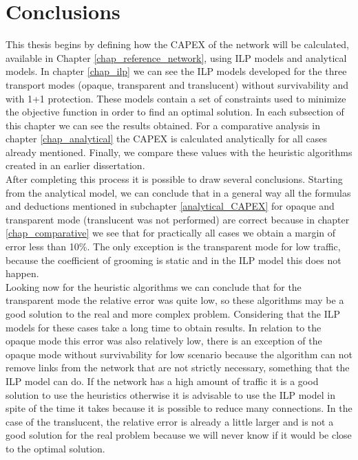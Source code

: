 \clearpage

\section{Conclusions}

This thesis begins by defining how the CAPEX of the network will be calculated, available in Chapter \ref{chap_reference_network}, using ILP models and analytical models. In chapter \ref{chap_ilp} we can see the ILP models developed for the three transport modes (opaque, transparent and translucent) without survivability and with 1+1 protection. These models contain a set of constraints used to minimize the objective function in order to find an optimal solution. In each subsection of this chapter we can see the results obtained. For a comparative analysis in chapter \ref{chap_analytical} the CAPEX is calculated analytically for all cases already mentioned. Finally, we compare these values with the heuristic algorithms created in an earlier dissertation.\\

After completing this process it is possible to draw several conclusions. Starting from the analytical model, we can conclude that in a general way all the formulas and deductions mentioned in subchapter \ref{analytical_CAPEX} for opaque and transparent mode (translucent was not performed) are correct because in chapter \ref{chap_comparative} we see that for practically all cases we obtain a margin of error less than 10\%. The only exception is the transparent mode for low traffic, because the coefficient of grooming is static and in the ILP model this does not happen.\\

Looking now for the heuristic algorithms we can conclude that for the transparent mode the relative error was quite low, so these algorithms may be a good solution to the real and more complex problem. Considering that the ILP models for these cases take a long time to obtain results. In relation to the opaque mode this error was also relatively low, there is an exception of the opaque mode without survivability for low scenario because the algorithm can not remove links from the network that are not strictly necessary, something that the ILP model can do. If the network has a high amount of traffic it is a good solution to use the heuristics otherwise it is advisable to use the ILP model in spite of the time it takes because it is possible to reduce many connections. In the case of the translucent, the relative error is already a little larger and is not a good solution for the real problem because we will never know if it would be close to the optimal solution.\\


